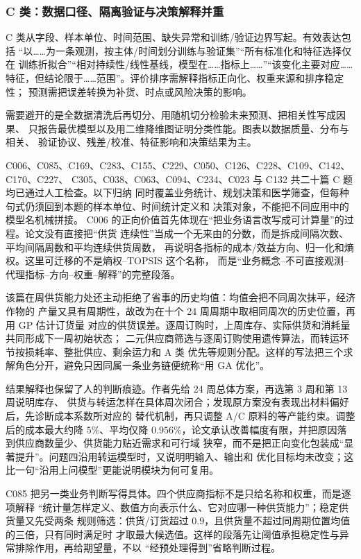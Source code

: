 \subsubsection{C 类：数据口径、隔离验证与决策解释并重}

C 类从字段、样本单位、时间范围、缺失异常和训练/验证边界写起。有效表达包括
“以……为一条观测，按主体/时间划分训练与验证集”“所有标准化和特征选择仅在
训练折拟合”“相对持续性/线性基线，模型在……指标上……”“该变化主要对应……
特征，但结论限于……范围”。评价排序需解释指标正向化、权重来源和排序稳定性；
预测需把误差转换为补货、时点或风险决策的影响。

需要避开的是全数据清洗后再切分、用随机切分检验未来预测、把相关性写成因果、
只报告最优模型以及用二维降维图证明分类性能。图表以数据质量、分布与相关、
验证协议、残差/校准、特征影响和决策结果为主。

C006、C085、C169、C283、C155、C229、C050、C126、C228、C109、C142、C170、C227、
C305、C038、C063、C094、C234、C023 与 C132 共二十篇 C 题均已通过人工检查。以下归纳
同时覆盖业务统计、规划决策和医学筛查，但每种句式仍须回到本题的样本单位、时间统计定义和
决策对象，不能把不同应用中的模型名机械拼接。
C006 的正向价值首先体现在“把业务语言改写成可计算量”的过程。论文没有直接把“供货
连续性”当成一个无来由的分数，而是拆成间隔次数、平均间隔周数和平均连续供货周数，
再说明各指标的成本/效益方向、归一化和熵权。这里可迁移的不是熵权--TOPSIS 这个名称，
而是“业务概念--不可直接观测--代理指标--方向--权重--解释”的完整段落。

该篇在周供货能力处还主动拒绝了省事的历史均值：均值会把不同周次抹平，经济作物的
产量又具有周期性，故改为在十个 24 周周期中取相同周次的历史位置，再用 GP 估计订货量
对应的供货误差。逐周订购时，上周库存、实际供货和消耗量共同形成下一周初始状态；
二元供应商筛选与逐周订购使用遗传算法，而转运环节按损耗率、整批供应、剩余运力和 A 类
优先等规则分配。这样的写法把三个求解角色分开，避免只因同属一条业务链便统称“用 GA
优化”。

结果解释也保留了人的判断痕迹。作者先给 24 周总体方案，再选第 3 周和第 13 周说明库存、
供货与转运怎样在具体周次闭合；发现原方案没有表现出材料偏好后，先诊断成本系数所对应的
替代机制，再只调整 A/C 原料的等产能约束。调整后的成本最大约降 $5\%$、平均仅降
$0.956\%$，论文承认改善幅度有限，并把原因落到供应商数量少、供货能力贴近需求和可行域
狭窄，而不是把正向变化包装成“显著提升”。问题四沿用转运模型时，又说明明输入、输出和
优化目标均未改变；这比一句“沿用上问模型”更能说明模块为何可复用。

C085 把另一类业务判断写得具体。四个供应商指标不是只给名称和权重，而是逐项解释
“统计量怎样定义、数值方向表示什么、它对应哪一种供货能力”；稳定供货量又先受两条
规则筛选：供货/订货超过 $0.9$，且供货量不超过同周期位置均值的三倍，只有同时满足时
才取最大候选值。这样的段落先让阈值承担稳定性与异常排除作用，再给期望量，不以
“经预处理得到”省略判断过程。

